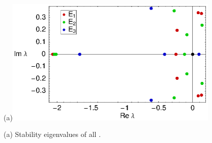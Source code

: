 \begin{figure}[t]
\begin{center}
(a)\includegraphics[width=4in]{figs/L22-eqvaEigenvalues.eps}
\end{center}
\caption{
(a) Stability eigenvalues of all \eqva.
}
\label{f:KS22EkEigs}
\end{figure}

